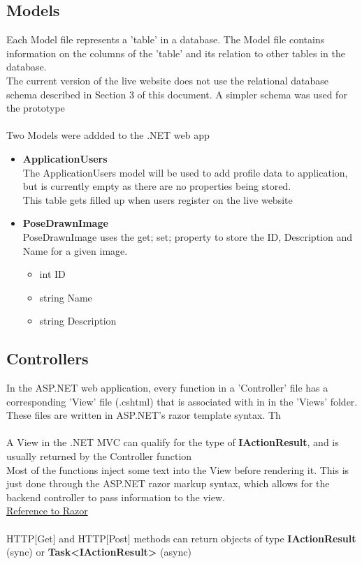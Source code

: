 \documentclass{scrreprt}
\begin{document}
\subsection{Models}

Each Model file represents a 'table' in a database. The Model file contains information on the columns of the 'table' and its relation to other tables in the database.
\\
The current version of the live website does not use the relational database schema described in Section 3 of this document. A simpler schema was used for the prototype
\\\\
Two Models were addded to the .NET web app

    \begin{itemize}
      \item \textbf{ApplicationUsers}
      \\
      The ApplicationUsers model will be used to add profile data to application, but is currently empty as there are no properties being stored.
      \\
      This table gets filled up when users register on the live website

      \item \textbf{PoseDrawnImage}
      \\
      PoseDrawnImage uses the {get; set;} property to store the ID, Description and Name for a given image.

      \begin{itemize}
        \item int ID
        \item string Name
        \item string Description
      \end{itemize}

    \end{itemize}

\subsection{Controllers}

In the ASP.NET web application, every function in a 'Controller' file has a corresponding 'View' file (.cshtml) that is associated with in in the 'Views' folder. These files are written in ASP.NET's razor template syntax. Th
\\\\
A View in the .NET MVC can qualify for the type of \textbf{IActionResult}, and is usually returned by the Controller function
\\
Most of the functions inject some text into the View before rendering it. This is just done through the ASP.NET razor markup syntax, which allows for the backend controller to pass information to the view.
\\
\href{https://docs.microsoft.com/en-us/aspnet/core/mvc/views/razor}{Reference to Razor}
\\\\
HTTP[Get] and HTTP[Post] methods can return objects of type \textbf{IActionResult} (sync) or \textbf{Task\textless IActionResult\textgreater} (async)
\end{document}
